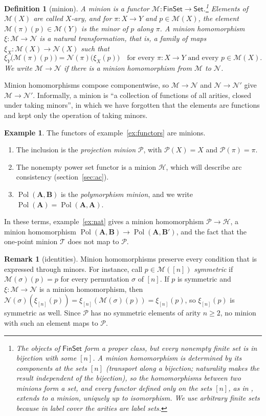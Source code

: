 \documentclass[11pt]{article}
\theoremstyle{plain}
\newtheorem{definition}[theorem]{Definition}
\theoremstyle{definition}
\newtheorem{example}[theorem]{Example}
\newtheorem{remark}[theorem]{Remark}
\newcommand{\cat}[1]{\mathsf{#1}}
\newcommand{\Set}{\cat{Set}}
\newcommand{\FinSet}{\cat{FinSet}}
\newcommand{\Pol}{\operatorname{Pol}}
\newcommand{\bA}{\mathbf{A}}
\newcommand{\bB}{\mathbf{B}}
\newcommand{\Pm}{\mathscr{P}}
\newcommand{\M}{\mathscr{M}}
\newcommand{\N}{\mathscr{N}}
\newcommand{\Hm}{\mathscr{H}}
\newcommand{\T}{\mathscr{T}}
\begin{document}
\begin{definition}[minion]\label{def:minion}
A \emph{minion} is a functor $\M\colon\FinSet\to\Set$.\footnote{The objects of $\FinSet$ form a proper class, but every nonempty finite set is in bijection with some $[n]$. A minion homomorphism is determined by its components at the sets $[n]$ (transport along a bijection; naturality makes the result independent of the bijection), so the homomorphisms between two minions form a set, and every functor defined only on the sets $[n]$, as in \cite{BBKO}, extends to a minion, uniquely up to isomorphism. We use arbitrary finite sets because in label cover the arities are label sets.} Elements of $\M(X)$ are called \emph{$X$-ary}, and for $\pi\colon X\to Y$ and $p\in\M(X)$, the element $\M(\pi)(p)\in\M(Y)$ is the \emph{minor} of $p$ along $\pi$. A \emph{minion homomorphism} $\xi\colon\M\to\N$ is a natural transformation, that is, a family of maps $\xi_X\colon\M(X)\to\N(X)$ such that
\[
\xi_Y\big(\M(\pi)(p)\big)=\N(\pi)\big(\xi_X(p)\big)\quad\text{for every } \pi\colon X\to Y \text{ and every } p\in\M(X).
\]
We write $\M\to\N$ if there is a minion homomorphism from $\M$ to $\N$.
\end{definition}

Minion homomorphisms compose componentwise, so $\M\to\N$ and $\N\to\N'$ give $\M\to\N'$. Informally, a minion is ``a collection of functions of all arities, closed under taking minors'', in which we have forgotten that the elements are functions and kept only the operation of taking minors.

\begin{example}\label{ex:minions}
The functors of example~\ref{ex:functors} are minions.
\begin{enumerate}[label=(\alph*)]
  \item The inclusion is the \emph{projection minion} $\Pm$, with $\Pm(X)=X$ and $\Pm(\pi)=\pi$.
  \item The nonempty power set functor is a minion $\Hm$, which will describe arc consistency (section~\ref{sec:ac}).
  \item $\Pol(\bA,\bB)$ is the \emph{polymorphism minion}, and we write $\Pol(\bA)=\Pol(\bA,\bA)$.
\end{enumerate}
In these terms, example~\ref{ex:nat} gives a minion homomorphism $\Pm\to\Hm$, a minion homomorphism $\Pol(\bA,\bB)\to\Pol(\bA,\bB')$, and the fact that the one-point minion $\T$ does not map to $\Pm$.
\end{example}

\begin{remark}[identities]\label{rem:identities}
Minion homomorphisms preserve every condition that is expressed through minors. For instance, call $p\in\M([n])$ \emph{symmetric} if $\M(\sigma)(p)=p$ for every permutation $\sigma$ of $[n]$. If $p$ is symmetric and $\xi\colon\M\to\N$ is a minion homomorphism, then $\N(\sigma)(\xi_{[n]}(p))=\xi_{[n]}(\M(\sigma)(p))=\xi_{[n]}(p)$, so $\xi_{[n]}(p)$ is symmetric as well. Since $\Pm$ has no symmetric elements of arity $n\geq2$, no minion with such an element maps to $\Pm$.
\end{remark}
\end{document}
